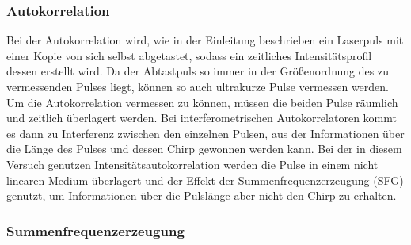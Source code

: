       \subsubsection{Autokorrelation}
        Bei der Autokorrelation wird, wie in der Einleitung beschrieben ein Laserpuls mit einer Kopie von sich selbst abgetastet, sodass ein zeitliches Intensitätsprofil dessen erstellt wird. Da der Abtastpuls
        so immer in der Größenordnung des zu vermessenden Pulses liegt, können so auch ultrakurze Pulse vermessen werden. Um die Autokorrelation vermessen zu können, müssen die beiden Pulse räumlich und
        zeitlich überlagert werden. Bei interferometrischen Autokorrelatoren kommt es dann zu Interferenz zwischen den einzelnen Pulsen, aus der Informationen über die Länge des Pulses und dessen Chirp 
        gewonnen werden kann. Bei der in diesem Versuch genutzen Intensitätsautokorrelation werden die Pulse in einem nicht linearen Medium überlagert und der Effekt der Summenfrequenzerzeugung (SFG) genutzt, 
        um Informationen über die Pulslänge aber nicht den Chirp zu erhalten.  


      \subsubsection{Summenfrequenzerzeugung}

